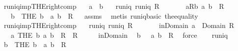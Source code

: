 \begin{isabellebody}
\endisatagproof
{\isafoldproof}%
%
\isadelimproof
\isanewline
%
\endisadelimproof
\isanewline
{}\isamarkupfalse%
\ runiq{\isacharunderscore}imp{\isacharunderscore}THE{\isacharunderscore}right{\isacharunderscore}comp{\isacharcolon}\isanewline
\ \ \ a\ \ b\isanewline
\ \ \ runiq{\isacharcolon}\ {\isachardoublequoteopen}runiq\ R{\isachardoublequoteclose}\isanewline
\ \ \ \ \ \ \ aRb{\isacharcolon}\ {\isachardoublequoteopen}{\isacharparenleft}a{\isacharcomma}\ b{\isacharparenright}\ {\isasymin}\ R{\isachardoublequoteclose}\isanewline
\ \ \ {\isachardoublequoteopen}b\ {\isacharequal}\ {\isacharparenleft}THE\ b\ {\isachardot}\ {\isacharparenleft}a{\isacharcomma}\ b{\isacharparenright}\ {\isasymin}\ R{\isacharparenright}{\isachardoublequoteclose}%
\isadelimproof
\ %
\endisadelimproof
%
\isatagproof
{}\isamarkupfalse%
\ assms\ \isamarkupfalse%
\ {\isacharparenleft}metis\ runiq{\isacharunderscore}basic\ the{\isacharunderscore}equality{\isacharparenright}%
\endisatagproof
{\isafoldproof}%
%
\isadelimproof
%
\endisadelimproof
\isanewline
\isanewline
{}\isamarkupfalse%
\ runiq{\isacharunderscore}imp{\isacharunderscore}THE{\isacharunderscore}right{\isacharunderscore}comp{\isacharprime}{\isacharcolon}\isanewline
\ \ \ runiq{\isacharcolon}\ {\isachardoublequoteopen}runiq\ R{\isachardoublequoteclose}\isanewline
\ \ \ \ \ \ \ in{\isacharunderscore}Domain{\isacharcolon}\ {\isachardoublequoteopen}a\ {\isasymin}\ Domain\ R{\isachardoublequoteclose}\isanewline
\ \ \ {\isachardoublequoteopen}{\isacharparenleft}a{\isacharcomma}\ THE\ b{\isachardot}\ {\isacharparenleft}a{\isacharcomma}\ b{\isacharparenright}\ {\isasymin}\ R{\isacharparenright}\ {\isasymin}\ R{\isachardoublequoteclose}\isanewline
%
\isadelimproof
%
\endisadelimproof
%
\isatagproof
{}\isamarkupfalse%
\ {\isacharminus}\isanewline
\ \ \isamarkupfalse%
\ in{\isacharunderscore}Domain\ \isamarkupfalse%
\ b\ \ {\isacharasterisk}{\isacharcolon}\ {\isachardoublequoteopen}{\isacharparenleft}a{\isacharcomma}\ b{\isacharparenright}\ {\isasymin}\ R{\isachardoublequoteclose}\ \isamarkupfalse%
\ force\isanewline
\ \ \isamarkupfalse%
\ runiq\ \isamarkupfalse%
\ {\isachardoublequoteopen}b\ {\isacharequal}\ {\isacharparenleft}THE\ b\ {\isachardot}\ {\isacharparenleft}a{\isacharcomma}\ b{\isacharparenright}\ {\isasymin}\ R{\isacharparenright}{\isachardoublequoteclose}\ \isamarkupfalse%

\end{isabellebody}
